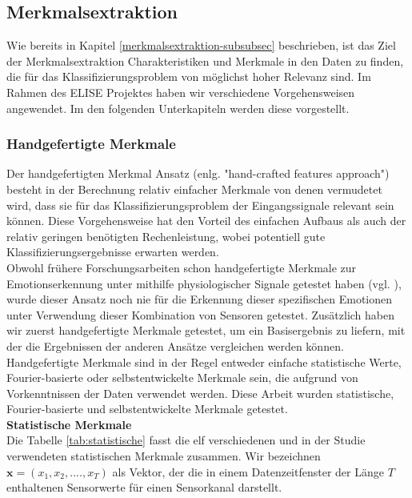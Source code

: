 \subsection{Merkmalsextraktion} \label{merkmalsextraftion-1}

Wie bereits in Kapitel \ref{merkmalsextraktion-subsubsec} beschrieben, ist das Ziel der Merkmalsextraktion Charakteristiken und Merkmale in den Daten zu finden, die für das
Klassifizierungsproblem von möglichst hoher Relevanz sind. Im Rahmen des ELISE Projektes haben wir verschiedene Vorgehensweisen angewendet. Im den folgenden Unterkapiteln werden diese vorgestellt. \\



\subsubsection{Handgefertigte Merkmale} \label{hc-features-1}
Der handgefertigten Merkmal Ansatz (enlg. "hand-crafted features approach") besteht in der Berechnung relativ einfacher Merkmale von denen vermudetet wird, dass sie für das Klassifizierungsproblem der Eingangssignale relevant sein können. Diese Vorgehensweise hat den Vorteil des einfachen Aufbaus als auch der relativ geringen benötigten Rechenleistung, wobei potentiell gute Klassifizierungsergebnisse erwarten werden. \\


Obwohl frühere Forschungsarbeiten schon handgefertigte Merkmale zur Emotionserkennung unter mithilfe physiologischer Signale getestet haben (vgl. \cite{martinez_ieee_2013}), wurde dieser Ansatz noch nie für die Erkennung dieser spezifischen Emotionen unter Verwendung dieser Kombination von Sensoren getestet.
Zusätzlich haben wir zuerst handgefertigte Merkmale getestet, um ein Basisergebnis zu liefern, mit der die Ergebnissen der anderen Ansätze vergleichen werden können.
Handgefertigte Merkmale sind in der Regel entweder einfache statistische Werte, Fourier-basierte oder selbstentwickelte Merkmale sein, die aufgrund von Vorkenntnissen der Daten verwendet werden. 
Diese Arbeit wurden statistische, Fourier-basierte und selbstentwickelte Merkmale getestet. \\

\textbf{Statistische Merkmale \\}
Die Tabelle \ref{tab:statistische} fasst die elf verschiedenen und in der Studie verwendeten statistischen Merkmale zusammen. Wir bezeichnen $\mathbf{x} = (x_1, x_2, ...., x_T) $ als Vektor, der die in einem Datenzeitfenster der Länge $T$ enthaltenen Sensorwerte für einen Sensorkanal darstellt. 


